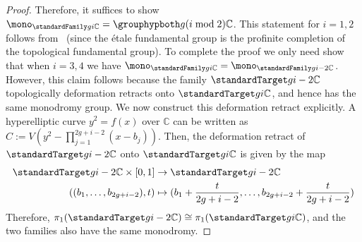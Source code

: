 \begin{proof}
Therefore, it suffices to show $\mono_{\standardFamily g i {\mathbb C}} = \grouphypboth g {(i \bmod 2)} {\mathbb C}$.
This statement for $i = 1,2$ follows from~\cite[Th\'eor\`eme 1]{acampo:tresses-monodromie-et-le-groupe-symplectique}
	(since the \'etale fundamental group is the profinite completion of the
	topological fundamental group).
To complete the proof we
only need show that when $i = 3, 4$
we have $\mono_{\standardFamily g i {\mathbb C}} = \mono_{\standardFamily g {i-2} {\mathbb C}}$.
However, this claim follows because the family
$\standardTarget g {i-2} {\mathbb C}$ topologically deformation retracts
onto $\standardTarget g i {\mathbb C}$, and hence has the
same monodromy group.
We now construct this deformation retract explicitly.
A hyperelliptic curve
$y^2 = f(x)$ over $\mathbb C$ can be written as
$C := V\left(y^2 - \prod_{j=1}^{2g+i-2} \left( x-b_j \right) \right)$.
Then, the deformation retract of $\standardTarget g {i-2} {\mathbb C}$ onto $\standardTarget g i {\mathbb C}$ is given by the map
\begin{align*}
 \standardTarget g {i-2} {\mathbb C} \times [0,1] 
& \rightarrow \standardTarget g {i-2} {\mathbb C}\\
\left((b_1, \ldots, b_{2g+i-2}), t\right)
& \mapsto (b_1 + \frac{t}{2g+i - 2}, \ldots, b_{2g+i-2} + \frac{t}{2g+i - 2})
\end{align*}
Therefore, $\pi_1(\standardTarget g {i-2}{\mathbb C}) \cong \pi_1(\standardTarget g i {\mathbb C})$, and the two families also have the same monodromy.
\end{proof}

